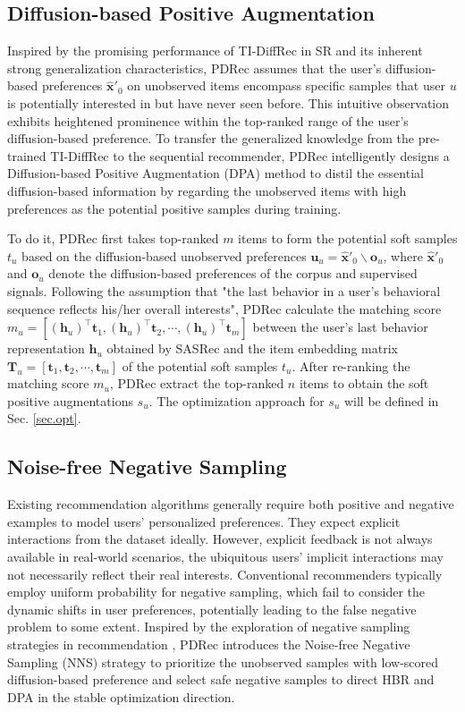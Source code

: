 \documentclass[letterpaper]{article} %
\begin{document}
\subsection{Diffusion-based Positive Augmentation}
Inspired by the promising performance of TI-DiffRec in SR and its inherent strong generalization characteristics, PDRec assumes that the user's diffusion-based preferences $\bm{\hat{x}'}_{0}$ on unobserved items encompass specific samples that user $u$ is potentially interested in but have never seen before. This intuitive observation exhibits heightened prominence within the top-ranked range of the user's diffusion-based preference. To transfer the generalized knowledge from the pre-trained TI-DiffRec to the sequential recommender, PDRec intelligently designs a Diffusion-based Positive Augmentation (DPA) method to distil the essential diffusion-based information by regarding the unobserved items with high preferences as the potential positive samples during training. 

To do it, PDRec first takes top-ranked $m$ items to form the potential soft samples $t_{u}$ based on the diffusion-based unobserved preferences $\bm{u}_{u}\!=\!\bm{\hat{x}'}_{0}\!\backslash\!\bm{o}_{u}$, where $\bm{\hat{x}'}_{0}$ and $\bm{o}_{u}$ denote the diffusion-based preferences of the corpus and supervised signals.
Following the assumption that "the last behavior in a user's behavioral sequence reflects his/her overall interests", PDRec calculate the matching score 
$m_u=[(\bm{h}_u)^\top\bm{t}_1,(\bm{h}_u)^\top\bm{t}_2,\cdots,(\bm{h}_u)^\top\bm{t}_m]$
between the user's last behavior representation $\bm{h}_u$ obtained by SASRec \cite{SASRec} and the item embedding matrix $\bm{T}_u=[\bm{t}_1,\bm{t}_2,\cdots,\bm{t}_m]$ of the potential soft samples $t_{u}$. After re-ranking the matching score $m_u$, PDRec extract the top-ranked $n$ items to obtain the soft positive augmentations $s_{u}$. The optimization approach for $s_{u}$ will be defined in Sec. \ref{sec.opt}.


\subsection{Noise-free Negative Sampling}
Existing recommendation algorithms generally require both positive and negative examples to model users' personalized preferences. They expect explicit interactions from the dataset ideally. However, explicit feedback is not always available in real-world scenarios, the ubiquitous users' implicit interactions may not necessarily reflect their real interests. Conventional recommenders typically employ uniform probability for negative sampling, which fail to consider the dynamic shifts in user preferences, potentially leading to the false negative problem to some extent. Inspired by the exploration of negative sampling strategies in recommendation \cite{DNS+, RealHNS}, PDRec introduces the Noise-free Negative Sampling (NNS) strategy to prioritize the unobserved samples with low-scored diffusion-based preference and select safe negative samples to direct HBR and DPA in the stable optimization direction.
\end{document}
